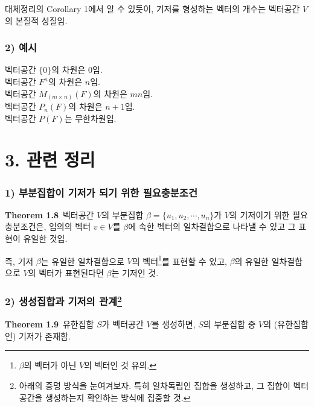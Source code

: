 \documentclass[10pt, a4paper]{article}
\begin{document}
대체정리의 Corollary 1에서 알 수 있듯이, 기저를 형성하는 벡터의 개수는 벡터공간 $V$의 본질적 성질임.

\subsubsection*{2) 예시}
벡터공간 $\{0\}$의 차원은 0임.\\
벡터공간 $F^n$의 차원은 $n$임.\\
벡터공간 $M_(m \times n)(F)$의 차원은 $mn$임.\\
벡터공간 $P_n(F)$의 차원은 $n+1$임.\\
벡터공간 $P(F)$는 무한차원임.


\section*{3. 관련 정리}
\subsubsection*{1) 부분집합이 기저가 되기 위한 필요충분조건}
\textbf{Theorem 1.8}\, 벡터공간 $V$의 부분집합 $\beta = \{u_1,u_2, \cdots ,u_n\}$가 $V$의 기저이기 위한 필요충분조건은, 임의의 벡터 $v \in V$를 $\beta$에 속한 벡터의 일차결합으로 나타낼 수 있고 그 표현이 유일한 것임.

즉, 기저 $\beta$는 유일한 일차결합으로 $V$의 벡터\footnote{$\beta$의 벡터가 아닌 $V$의 벡터인 것 유의.}를 표현할 수 있고, $\beta$의 유일한 일차결합으로 $V$의 벡터가 표현된다면 $\beta$는 기저인 것.


\newpage


\subsubsection*{2) 생성집합과 기저의 관계\footnote{아래의 증명 방식을 눈여겨보자. 특히 일차독립인 집합을 생성하고, 그 집합이 벡터공간을 생성하는지 확인하는 방식에 집중할 것.}}
\textbf{Theorem 1.9}\, 유한집합 $S$가 벡터공간 $V$를 생성하면, $S$의 부분집합 중 $V$의 (유한집합인) 기저가 존재함.
\end{document}

